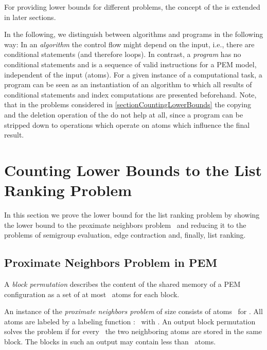 \documentclass[envcountsame]{llncs}
\begin{document}
For providing lower bounds for different problems, the concept of the \linebreak\movePEM is extended in later sections.

In the following, we distinguish between {algorithms} and {programs} in the following way:
In an \emph{algorithm} the control flow might depend on the input, i.e., there are conditional statements (and therefore loops).
In contrast, a \emph{program} has no conditional statements and is a sequence of valid instructions for a PEM model, independent of the input (atoms). For a given instance of a computational task, a program can be seen as an instantiation of an algorithm to which all results of conditional statements and index computations are presented beforehand.
Note, that in the problems considered in \autoref{sectionCountingLowerBounds} the copying and the deletion operation of the \movePEM do not help at all, since a program can be stripped down to operations which operate on atoms which influence the final result. 





\section{Counting Lower Bounds to the List Ranking Problem}
\label{sectionCountingLowerBounds}
In this section we prove the lower bound for the list ranking problem by showing the lower bound to the proximate neighbors problem~\cite{1995ChiangExternalMemoryGraphAlgorithms} and reducing it to the problems of semigroup evaluation, edge contraction and, finally, list ranking. 


\subsection{Proximate Neighbors Problem in PEM}



\begin{definition}
  A \emph{block permutation} describes the content of the shared memory of a PEM configuration as a set of at most~ atoms for each block.
\end{definition}

\begin{definition}
  An instance of the \emph{proximate neighbors problem} of size  consists of atoms~ for .
  All atoms are labeled by a labeling function \mbox{: } with .
  An output block permutation solves the problem if for every~ the two neighboring atoms  are stored in the same block. 
  The blocks in such an output may contain less than~ atoms.
\end{definition}
\end{document}
